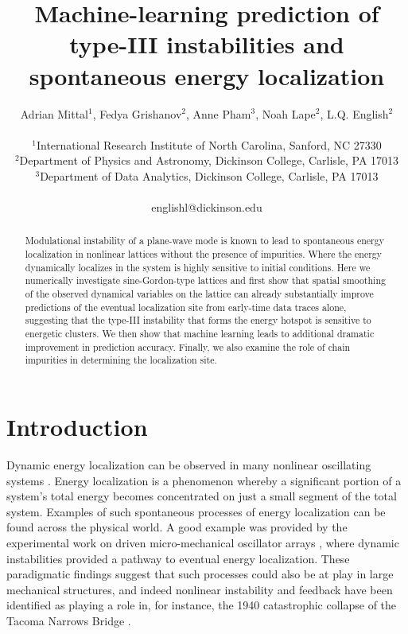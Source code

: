 \documentclass[11pt]{article}
\title{Machine-learning prediction of type-III instabilities and spontaneous energy localization}
\author{Adrian Mittal$^1$, Fedya Grishanov$^2$, Anne Pham$^3$, Noah Lape$^2$, L.Q. English$^2$\\
\\
$^1$International Research Institute of North Carolina, Sanford, NC 27330\\
$^2$Department of Physics and Astronomy, Dickinson College, Carlisle, PA 17013\\
$^3$Department of Data Analytics, Dickinson College, Carlisle, PA 17013\\
\\
{\small englishl@dickinson.edu}}
\date{}
\begin{document}
\maketitle

\begin{abstract}
Modulational instability of a plane-wave mode is known to lead to spontaneous energy localization in nonlinear lattices without the presence of impurities. Where the energy dynamically localizes in the system is highly sensitive to initial conditions. Here we numerically investigate sine-Gordon-type lattices and first show that spatial smoothing of the observed dynamical variables on the lattice can already substantially improve predictions of the eventual localization site from early-time data traces alone, suggesting that the type-III instability that forms the energy hotspot is sensitive to energetic clusters. We then show that machine learning leads to additional dramatic improvement in prediction accuracy. Finally, we also examine the role of chain impurities in determining the localization site.
\end{abstract}


\section{Introduction}
Dynamic energy localization can be observed in many nonlinear oscillating systems \cite{campbell2004localizing}. Energy localization is a phenomenon whereby a significant portion of a system's total energy becomes concentrated on just a small segment of the total system. Examples of such spontaneous processes of energy localization can be found across the physical world. A good example was provided by the experimental work on driven micro-mechanical oscillator arrays \cite{sato2006colloquium}, where dynamic instabilities provided a pathway to eventual energy localization. These paradigmatic findings suggest that such processes could also be at play in large mechanical structures, and indeed nonlinear instability and feedback have been identified as playing a role in, for instance, the 1940 catastrophic collapse of the Tacoma Narrows Bridge \cite{green2006failure,ARIOLI2015901}.
\end{document}
